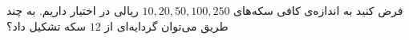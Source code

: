 \EXERCISE
فرض کنید به اندازه‌ی کافی سکه‌های
$10, 20, 50, 100, 250$
ریالی در اختیار داریم. به چند طریق می‌توان گردایه‌ای از
$12$
سکه تشکیل داد؟